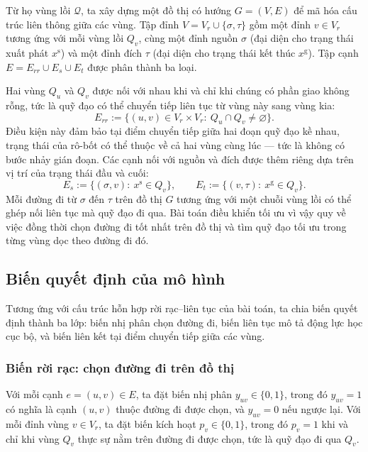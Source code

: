 Từ họ vùng lồi $\mathcal{Q}$, ta xây dựng một đồ thị có hướng $G=(V,E)$ để mã hóa cấu trúc liên thông giữa các vùng. Tập đỉnh $V=V_r\cup\{\sigma,\tau\}$ gồm một đỉnh $v\in V_r$ tương ứng với mỗi vùng lồi $Q_v$, cùng một đỉnh nguồn $\sigma$ (đại diện cho trạng thái xuất phát $x^{\mathrm{s}}$) và một đỉnh đích $\tau$ (đại diện cho trạng thái kết thúc $x^{\mathrm{g}}$). Tập cạnh $E=E_{rr}\cup E_s\cup E_t$ được phân thành ba loại.

Hai vùng $Q_u$ và $Q_v$ được nối với nhau khi và chỉ khi chúng có phần giao không rỗng, tức là quỹ đạo có thể chuyển tiếp liên tục từ vùng này sang vùng kia:
\begin{equation}
E_{rr}:=\bigl\{(u,v)\in V_r\times V_r:\ Q_u\cap Q_v\neq \varnothing\bigr\}.
\label{eq:adjacency_ocp}
\end{equation}
Điều kiện này đảm bảo tại điểm chuyển tiếp giữa hai đoạn quỹ đạo kề nhau, trạng thái của rô-bốt có thể thuộc về cả hai vùng cùng lúc — tức là không có bước nhảy gián đoạn. Các cạnh nối với nguồn và đích được thêm riêng dựa trên vị trí của trạng thái đầu và cuối:
\begin{equation}
E_s:=\bigl\{(\sigma,v):\ x^{\mathrm s}\in Q_v\bigr\},
\qquad
E_t:=\bigl\{(v,\tau):\ x^{\mathrm g}\in Q_v\bigr\}.
\label{eq:boundary_edges_ocp}
\end{equation}
Mỗi đường đi từ $\sigma$ đến $\tau$ trên đồ thị $G$ tương ứng với một chuỗi vùng lồi có thể ghép nối liên tục mà quỹ đạo đi qua. Bài toán điều khiển tối ưu vì vậy quy về việc đồng thời chọn đường đi tốt nhất trên đồ thị và tìm quỹ đạo tối ưu trong từng vùng dọc theo đường đi đó.

\subsection{Biến quyết định của mô hình}
\label{subsec:decision_vars}

Tương ứng với cấu trúc hỗn hợp rời rạc–liên tục của bài toán, ta chia biến quyết định thành ba lớp: biến nhị phân chọn đường đi, biến liên tục mô tả động lực học cục bộ, và biến liên kết tại điểm chuyển tiếp giữa các vùng.

\subsubsection{Biến rời rạc: chọn đường đi trên đồ thị}

Với mỗi cạnh $e=(u,v)\in E$, ta đặt biến nhị phân $y_{uv}\in\{0,1\}$, trong đó $y_{uv}=1$ có nghĩa là cạnh $(u,v)$ thuộc đường đi được chọn, và $y_{uv}=0$ nếu ngược lại. Với mỗi đỉnh vùng $v\in V_r$, ta đặt biến kích hoạt $p_v\in\{0,1\}$, trong đó $p_v=1$ khi và chỉ khi vùng $Q_v$ thực sự nằm trên đường đi được chọn, tức là quỹ đạo đi qua $Q_v$.

